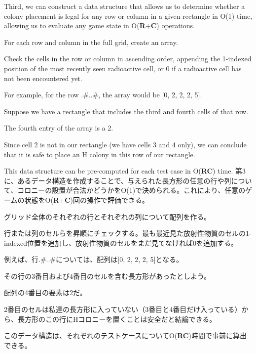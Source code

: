 \documentclass[uplatex,dvipdfmx]{jsarticle} \usepackage{amsmath,amssymb,bm}
\begin{document}
\vspace{\baselineskip}
\begin{paracol}{2}
Third, we can construct a data structure that allows us to determine whether a colony placement is legal for any row or column in a given rectangle in O(1) time, allowing us to evaluate any game state in O({\bf R}+{\bf C}) operations.

For each row and column in the full grid, create an array.

Check the cells in the row or column in ascending order, appending the 1-indexed position of the most recently seen radioactive cell, or 0 if a radioactive cell has not been encountered yet.

For example, for the row .\#..\#, the array would be [0, 2, 2, 2, 5].

Suppose we have a rectangle that includes the third and fourth cells of that row.

The fourth entry of the array is a 2.

Since cell 2 is not in our rectangle (we have cells 3 and 4 only), we can conclude that it is safe to place an H colony in this row of our rectangle.

This data structure can be pre-computed for each test case in O({\bf RC}) time.
\switchcolumn
第3に、あるデータ構造を作成することで、与えられた長方形の任意の行や列について、コロニーの設置が合法かどうかをO(1)で決められる。これにより、任意のゲームの状態をO({\bf R}+{\bf C})回の操作で評価できる。

グリッド全体のそれぞれの行とそれぞれの列について配列を作る。

行または列のセルらを昇順にチェックする。最も最近見た放射性物質のセルの1-indexed位置を追加し、放射性物質のセルをまだ見てなければ0を追加する。

例えば、行.\#..\#については、配列は[0, 2, 2, 2, 5]となる。

その行の3番目および4番目のセルを含む長方形があったとしよう。

配列の4番目の要素は2だ。

2番目のセルは私達の長方形に入っていない（3番目と4番目だけ入っている）から、長方形のこの行にHコロニーを置くことは安全だと結論できる。

このデータ構造は、それぞれのテストケースについてO({\bf RC})時間で事前に算出できる。
\end{paracol}
\vspace{\baselineskip}
\end{document}
